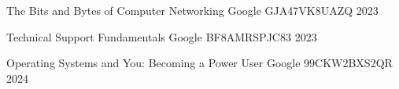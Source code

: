 

\begin{cvhonors}

  \cvhonor
    {The Bits and Bytes of Computer Networking} %
    {Google} %
    {GJA47VK8UAZQ} %
    {2023} %

  \cvhonor
    {Technical Support Fundamentals} %
    {Google} %
    {BF8AMRSPJC83} %
    {2023} %

  \cvhonor
    {Operating Systems and You: Becoming a Power User} %
    {Google} %
    {99CKW2BXS2QR} %
    {2024} %


\end{cvhonors}
